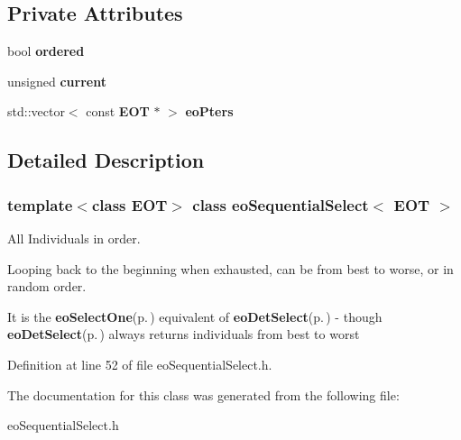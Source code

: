 \subsection*{Private Attributes}
\begin{CompactItemize}
\item 
bool {\bf ordered}\label{classeo_sequential_select_r0}

\item 
unsigned {\bf current}\label{classeo_sequential_select_r1}

\item 
std::vector$<$ const {\bf EOT} $\ast$ $>$ {\bf eo\-Pters}\label{classeo_sequential_select_r2}

\end{CompactItemize}


\subsection{Detailed Description}
\subsubsection*{template$<$class EOT$>$ class eo\-Sequential\-Select$<$ EOT $>$}

All Individuals in order. 

Looping back to the beginning when exhausted, can be from best to worse, or in random order.

It is the {\bf eo\-Select\-One}{\rm (p.\,\pageref{classeo_select_one})} equivalent of {\bf eo\-Det\-Select}{\rm (p.\,\pageref{classeo_det_select})} - though {\bf eo\-Det\-Select}{\rm (p.\,\pageref{classeo_det_select})} always returns individuals from best to worst 



Definition at line 52 of file eo\-Sequential\-Select.h.

The documentation for this class was generated from the following file:\begin{CompactItemize}
\item 
eo\-Sequential\-Select.h\end{CompactItemize}
